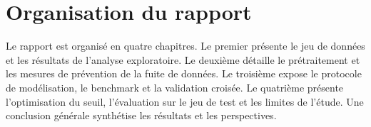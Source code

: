 \section*{Organisation du rapport}
Le rapport est organisé en quatre chapitres. Le premier présente le jeu de données et les résultats de l'analyse exploratoire. Le deuxième détaille le prétraitement et les mesures de prévention de la fuite de données. Le troisième expose le protocole de modélisation, le benchmark et la validation croisée. Le quatrième présente l'optimisation du seuil, l'évaluation sur le jeu de test et les limites de l'étude. Une conclusion générale synthétise les résultats et les perspectives.
\endgroup
